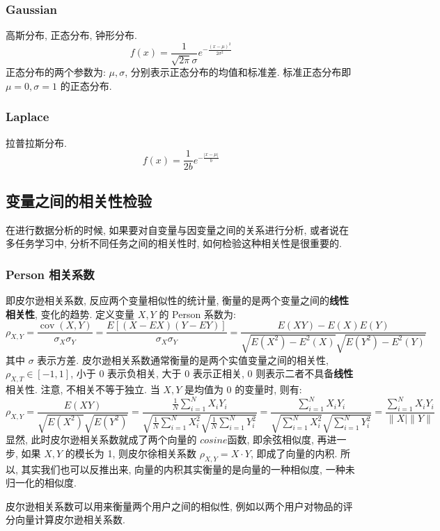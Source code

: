 \subsubsection{Gaussian}高斯分布, 正态分布, 钟形分布. 
$$
f(x) = \frac{1}{\sqrt{2 \pi} \sigma} e^{- \frac{(x - \mu)^2 }{2 \sigma^2}}
$$
正态分布的两个参数为: $\mu, \sigma$, 分别表示正态分布的均值和标准差. 标准正态分布即 $\mu = 0, \sigma = 1$ 的正态分布. 

\subsubsection{Laplace}拉普拉斯分布. 
$$
f(x) = \frac{1}{2b} e^{- \frac{{|x - \mu|}}{b}}
$$


\subsection{变量之间的相关性检验}
在进行数据分析的时候, 如果要对自变量与因变量之间的关系进行分析, 或者说在多任务学习中, 分析不同任务之间的相关性时, 如何检验这种相关性是很重要的. 

\subsubsection{Person 相关系数}
即皮尔逊相关系数, 反应两个变量相似性的统计量, 衡量的是两个变量之间的\textbf{线性相关性}, 变化的趋势. 定义变量 $X, Y$ 的 Person 系数为: 
$$
\rho_{X, Y}=\frac{\operatorname{cov}(X, Y)}{\sigma_{X} \sigma_{Y}}=\frac{E[(X-E X)(Y-E Y)]}{\sigma_{X} \sigma_{Y}}=\frac{E(X Y)-E(X) E(Y)}{\sqrt{E\left(X^{2}\right)-E^{2}(X)} \sqrt{E\left(Y^{2}\right)-E^{2}(Y)}}
$$
其中 $\sigma$ 表示方差. 皮尔逊相关系数通常衡量的是两个实值变量之间的相关性, $\rho_{X, T} \in [-1, 1]$, 小于 0 表示负相关, 大于 0 表示正相关, 0 则表示二者不具备\textbf{线性}相关性. 注意, 不相关不等于独立. 当 $X, Y$ 是均值为 0 的变量时, 则有: 
$$
\rho_{X, Y}=\frac{E(X Y)}{\sqrt{E\left(X^{2}\right)} \sqrt{E\left(Y^{2}\right)}}=\frac{\frac{1}{N} \sum_{i=1}^{N} X_{i} Y_{i}}{\sqrt{\frac{1}{N} \sum_{i=1}^{N} X_{i}^{2}} \sqrt{\frac{1}{N} \sum_{i=1}^{N} Y_{i}^{2}}}=\frac{\sum_{i=1}^{N} X_{i} Y_{i}}{\sqrt{\sum_{i=1}^{N} X_{i}^{2}} \sqrt{\sum_{i=1}^{N} Y_{i}^{2}}}=\frac{\sum_{i=1}^{N} X_{i} Y_{i}}{\|X \mid\| Y \|}
$$
显然, 此时皮尔逊相关系数就成了两个向量的 $cosine$函数, 即余弦相似度, 再进一步, 如果 $X, Y$ 的模长为 1, 则皮尔徐相关系数 $\rho_{X, Y} = X \cdot Y$, 即成了向量的内积. 所以, 其实我们也可以反推出来, 向量的内积其实衡量的是向量的一种相似度, 一种未归一化的相似度. 

皮尔逊相关系数可以用来衡量两个用户之间的相似性, 例如以两个用户对物品的评分向量计算皮尔逊相关系数. 

